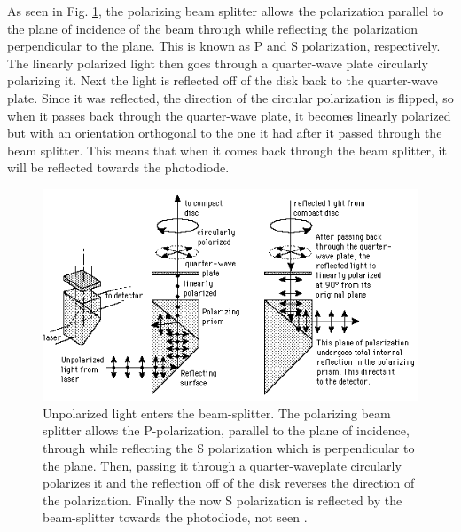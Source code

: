 \documentclass[ notitlepage, numerical, 11pt]{revtex4-1} %
\begin{document}
As seen in Fig. \ref{prism}, the polarizing beam splitter allows the polarization parallel to the plane of incidence of the beam through while reflecting the polarization perpendicular to the plane. This is known as P and S polarization, respectively. The linearly polarized light then goes through a quarter-wave plate circularly polarizing it. Next the light is reflected off of the disk back to the quarter-wave plate. Since it was reflected, the direction of the circular polarization is flipped, so when it passes back through the quarter-wave plate, it becomes linearly polarized but with an orientation orthogonal to the one it had after it passed through the beam splitter. This means that when it comes back through the beam splitter, it will be reflected towards the photodiode. 
\begin{figure}[H]
\centerline{\includegraphics[scale=.8]{prism.png}}
\caption{Unpolarized light enters the beam-splitter. The polarizing beam splitter allows the P-polarization, parallel to the plane of incidence, through while reflecting the S polarization which is perpendicular to the plane. Then, passing it through a quarter-waveplate circularly polarizes it and the reflection off of the disk reverses the direction of the polarization. Finally the now S polarization is reflected by the beam-splitter towards the photodiode, not seen \cite {hyper, optics}.}
\label{prism}
\end{figure} 
\end{document}
